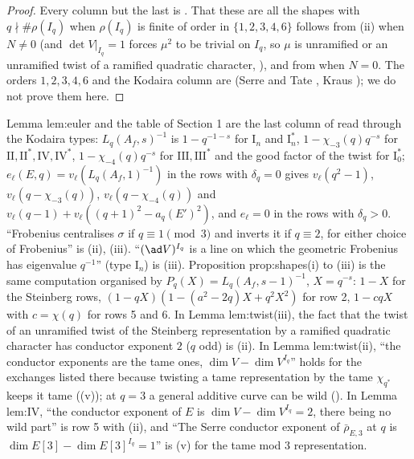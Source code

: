 \begin{proof}
Every column but the last is . That these are all the shapes with $q\nmid\#\rho(I_q)$
when $\rho(I_q)$ is finite of order in $\{1,2,3,4,6\}$ follows from (ii) when $N\ne0$ (and $\det V|_{I_q}=1$ forces $\mu^2$ to be trivial on
$I_q$, so $\mu$ is unramified or an unramified twist of a ramified quadratic character, ), and from  when $N=0$. The orders $1,2,3,4,6$ and the Kodaira column are
 (Serre and Tate \cite{SerreTate68}, Kraus \cite{Kraus90}); we do not prove them here.
\end{proof}

\begin{paperlink}\label{pl:local:euler}
Lemma lem:euler and the table of Section 1 are the last column of  read through the Kodaira types: $L_q(A_f,s)^{-1}$ is $1-q^{-1-s}$ for
$\mathrm{I}_n$ and $\mathrm{I}_n^*$, $1-\chi_{-3}(q)q^{-s}$ for $\mathrm{II},\mathrm{II}^*,\mathrm{IV},\mathrm{IV}^*$, $1-\chi_{-4}(q)q^{-s}$ for $\mathrm{III},\mathrm{III}^*$ and the good
factor of the twist for $\mathrm{I}_0^*$; $e_\ell(E,q)=v_\ell(L_q(A_f,1)^{-1})$ in the rows with $\delta_q=0$ gives $v_\ell(q^2-1)$, $v_\ell(q-\chi_{-3}(q))$, $v_\ell(q-\chi_{-4}(q))$ and
$v_\ell(q-1)+v_\ell((q+1)^2-a_q(E')^2)$, and $e_\ell=0$ in the rows with $\delta_q>0$. ``Frobenius centralises $\sigma$ if $q\equiv1\pmod3$ and inverts it if $q\equiv2$, for
either choice of Frobenius'' is (ii), (iii). ``$(\ad V)^{I_q}$ is a line on which the geometric Frobenius has eigenvalue $q^{-1}$''
(type $\mathrm{I}_n$) is (iii). Proposition prop:shapes(i) to (iii) is the same computation organised by $P_q(X)=L_q(A_f,s-1)^{-1}$,
$X=q^{-s}$: $1-X$ for the Steinberg rows, $(1-qX)(1-(a^2-2q)X+q^2X^2)$ for row 2, $1-cqX$ with $c=\chi(q)$ for rows 5 and 6. In Lemma lem:twist(iii), the fact that the twist of an
unramified twist of the Steinberg representation by a ramified quadratic character has conductor exponent $2$ ($q$ odd) is
(ii). In Lemma lem:twist(ii), ``the conductor exponents are the tame ones, $\dim V-\dim V^{I_q}$'' holds for the exchanges listed there
because twisting a tame representation by the tame $\chi_{q^*}$ keeps it tame ((v)); at $q=3$ a general additive curve can be
wild (). In Lemma lem:IV, ``the conductor exponent of $E$ is $\dim V-\dim V^{I_q}=2$, there being no wild part'' is row 5 with
(ii), and ``The Serre conductor exponent of $\bar\rho_{E,3}$ at $q$ is $\dim E[3]-\dim E[3]^{I_q}=1$'' is (v) for the tame
mod $3$ representation.
\end{paperlink}

